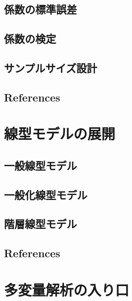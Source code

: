 \documentclass[
  a4paper,
]{ltjsbook}
\begin{document}
\section{係数の標準誤差}\label{ux4fc2ux6570ux306eux6a19ux6e96ux8aa4ux5dee}

\section{係数の検定}\label{ux4fc2ux6570ux306eux691cux5b9a}

\section{サンプルサイズ設計}\label{ux30b5ux30f3ux30d7ux30ebux30b5ux30a4ux30baux8a2dux8a08}

\section{References}\label{references-10}



\chapter{線型モデルの展開}\label{ux7ddaux578bux30e2ux30c7ux30ebux306eux5c55ux958b}

\section{一般線型モデル}\label{ux4e00ux822cux7ddaux578bux30e2ux30c7ux30eb}

\section{一般化線型モデル}\label{ux4e00ux822cux5316ux7ddaux578bux30e2ux30c7ux30eb}

\section{階層線型モデル}\label{ux968eux5c64ux7ddaux578bux30e2ux30c7ux30eb}

\section{References}\label{references-11}



\chapter{多変量解析の入り口}\label{ux591aux5909ux91cfux89e3ux6790ux306eux5165ux308aux53e3}
\end{document}
